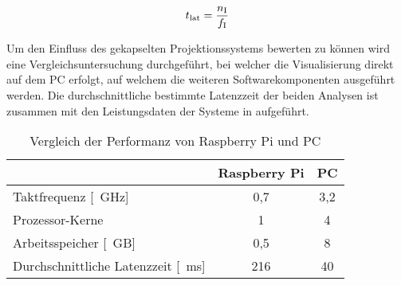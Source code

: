 \begin{equation}
t_{\mathrm{lat}} = \frac{n_{\mathrm{I}}}{f_{\mathrm{I}}}
\end{equation}


Um den Einfluss des gekapselten Projektionssystems bewerten zu können wird eine Vergleichsuntersuchung durchgeführt, bei welcher die Visualisierung direkt auf dem PC erfolgt, auf welchem die weiteren Softwarekomponenten ausgeführt werden. Die durchschnittliche bestimmte Latenzzeit der beiden Analysen ist zusammen mit den Leistungsdaten der Systeme in  aufgeführt.

\prever{
}


\begin{table}[ht]
\caption{Vergleich der Performanz von Raspberry Pi und PC}
\begin{center}
\begin{tabular}{|l|c|c|}
\hline
\rowcolor{lightgray} & \multicolumn{1}{|c|}{\textbf{Raspberry Pi}} & \multicolumn{1}{|c|}{\textbf{PC}}\\
\hline
Taktfrequenz [\SI{}{\GHz}] & 0,7 & 3,2 \\
\hline
Prozessor-Kerne & 1 & 4\\
\hline
Arbeitsspeicher [\SI{}{GB}] & 0,5 & 8\\
\hline
Durchschnittliche Latenzzeit [\SI{}{\milli\second}] & 216 & 40 \\
\hline
\end{tabular}
\end{center}
\label{tab.latency}
\end{table}

